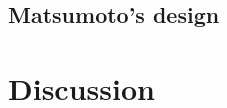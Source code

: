 \documentclass[12pt,twoside]{article}
\theoremstyle{plain}
\theoremstyle{definition}
\theoremstyle{remark}
\begin{document}
\subsection{Matsumoto's design}

\section{Discussion}
\label{sec:discuss}


%
%



\end{document}

